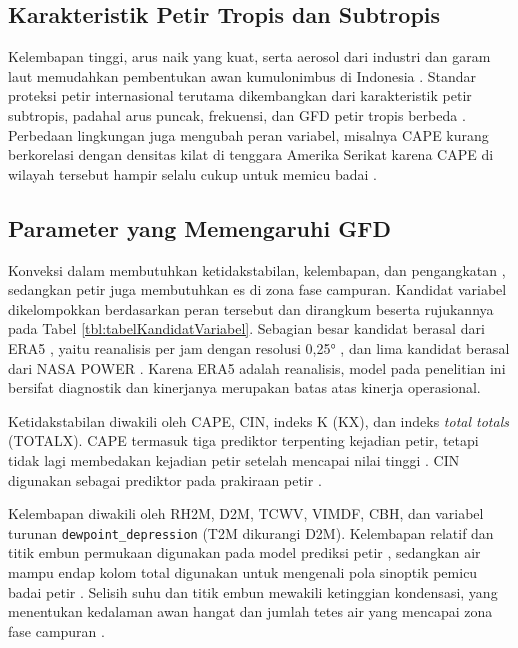 \subsection{Karakteristik Petir Tropis dan Subtropis}
Kelembapan tinggi, arus naik yang kuat, serta aerosol dari industri dan garam laut memudahkan pembentukan awan kumulonimbus di Indonesia \cite{denov2022}.
Standar proteksi petir internasional terutama dikembangkan dari karakteristik petir subtropis, padahal arus puncak, frekuensi, dan GFD petir tropis berbeda \cite{denov2025RNFPA}.
Perbedaan lingkungan juga mengubah peran variabel, misalnya CAPE kurang berkorelasi dengan densitas kilat di tenggara Amerika Serikat karena CAPE di wilayah tersebut hampir selalu cukup untuk memicu badai \cite{cheng2024MLLP}.

\subsection{Parameter yang Memengaruhi GFD}
Konveksi dalam membutuhkan ketidakstabilan, kelembapan, dan pengangkatan \cite{haywardTBD}, sedangkan petir juga membutuhkan es di zona fase campuran.
Kandidat variabel dikelompokkan berdasarkan peran tersebut dan dirangkum beserta rujukannya pada Tabel \ref{tbl:tabelKandidatVariabel}.
Sebagian besar kandidat berasal dari ERA5 \cite{hersbach2020era5}, yaitu reanalisis per jam dengan resolusi 0,25° \cite{shanTBDMLI}, dan lima kandidat berasal dari NASA POWER \cite{nasapower}.
Karena ERA5 adalah reanalisis, model pada penelitian ini bersifat diagnostik dan kinerjanya merupakan batas atas kinerja operasional.



Ketidakstabilan diwakili oleh CAPE, CIN, indeks K (KX), dan indeks \textit{total totals} (TOTALX).
CAPE termasuk tiga prediktor terpenting kejadian petir, tetapi tidak lagi membedakan kejadian petir setelah mencapai nilai tinggi \cite{shanTBDMLI}.
CIN digunakan sebagai prediktor pada prakiraan petir \cite{sobash2025MLP}.

Kelembapan diwakili oleh RH2M, D2M, TCWV, VIMDF, CBH, dan variabel turunan \texttt{dewpoint\_depression} (T2M dikurangi D2M).
Kelembapan relatif dan titik embun permukaan digunakan pada model prediksi petir \cite{shanTBDMLI, sobash2025MLP}, sedangkan air mampu endap kolom total digunakan untuk mengenali pola sinoptik pemicu badai petir \cite{haywardTBD}.
Selisih suhu dan titik embun mewakili ketinggian kondensasi, yang menentukan kedalaman awan hangat dan jumlah tetes air yang mencapai zona fase campuran \cite{shanTBDMLI}.

